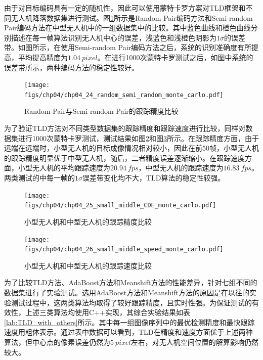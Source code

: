 由于对目标编码具有一定的随机性，因此可以使用蒙特卡罗方案对TLD框架和不同无人机降落数据集进行测试。图\ref{fig:chp04_24_random_semi_random_monte_carlo}所示是Random Pair编码方法和Semi-random Pair编码方法在中型无人机中的一组数据集中的比较。其中蓝色曲线和橙色曲线分别描述在每一帧算法识别无人机中心的误差，浅蓝色和浅橙色阴影为$1\sigma$的误差带。如图所示，在使用Semi-random Pair编码方法之后，系统的识别准确度有所提高，平均提高精度为$1.04\ pixel$。在进行1000次蒙特卡罗测试之后，如图中系统的误差带所示，两种编码方法的稳定性较好。

\begin{figure}[ht]   
	\centering
	\texttt{[image: figs/chp04/chp04\_24\_random\_semi\_random\_monte\_carlo.pdf]}
	\caption{Random Pair与Semi-random Pair的跟踪精度比较}
	\label{fig:chp04_24_random_semi_random_monte_carlo}
\end{figure}

为了验证TLD方法对不同类型数据集的跟踪精度和跟踪速度进行比较，同样对数据集进行1000次蒙特卡罗测试，测试结果如图\ref{fig:chp04_25_small_middle_CDE_monte_carlo}和图\ref{fig:chp04_26_small_middle_speed_monte_carlo}所示。在跟踪精度方面，由于远端在远端时，小型无人机的目标成像情况相对较小，因此在前50帧，小型无人机的跟踪精度明显优于中型无人机，随后，二者精度误差逐渐缩小。在跟踪速度方面，小型无人机的平均跟踪速度为$20.94\ fps$，中型无人机的跟踪速度为$16.83\ fps$。两类测试的中每一帧的$1\sigma$误差带变化均不大，TLD算法的稳定性较强。

\begin{figure}[ht]   
	\centering
	\texttt{[image: figs/chp04/chp04\_25\_small\_middle\_CDE\_monte\_carlo.pdf]}
	\caption{小型无人机和中型无人机的跟踪精度比较}
	\label{fig:chp04_25_small_middle_CDE_monte_carlo}
\end{figure}

\begin{figure}[ht]   
	\centering
	\texttt{[image: figs/chp04/chp04\_26\_small\_middle\_speed\_monte\_carlo.pdf]}
	\caption{小型无人机和中型无人机的跟踪速度比较}
	\label{fig:chp04_26_small_middle_speed_monte_carlo}
\end{figure}

为了比较TLD方法、AdaBoost方法和Meanshift方法的性能差异，针对七组不同的数据集进行了实验测试。选用AdaBoost方法和Meanshift方法的原因是在以往的实验测试过程中，这两类算法均取得了较好跟踪精度，且实时性强。为保证测试的有效性，上述三类算法均使用C++实现，其综合实验结果如表\ref{lab:TLD_with_others}所示。其中每一组图像序列中的最优检测精度和最快跟踪速度用粗体表示。通过表中数据可以看到，TLD在精度和速度方面优于上述两种算法，但中心点的像素误差仍然为$5\ pixel$左右，对无人机空间位置的解算影响仍然较大。

